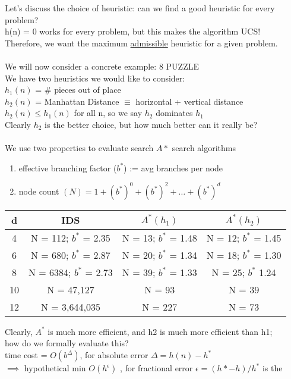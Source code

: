\documentclass[../../lecture_notes.tex]{subfiles}
\begin{document}
\noindent Let’s discuss the choice of heuristic: can we find a good heuristic for every problem?\\
	\indent h(n) = 0 works for every problem, but this makes the algorithm UCS!\\
Therefore, we want the maximum \underline{admissible} heuristic for a given problem.\\
\\
We will now consider a concrete example: 8 PUZZLE\\
We have two heuristics we would like to consider:\\
\indent $h_1(n)$ = \# pieces out of place \\
\indent $h_2(n)$ = Manhattan Distance $\equiv$ horizontal + vertical distance \\
$h_2(n) \leq h_1(n)$ for all n, so we say $h_2$ dominates $h_1$\\
Clearly $h_2$ is the better choice, but how much better can it really be?\\
\\
We use two properties to evaluate search $A*$ search algorithms
\begin{enumerate} [itemsep=0mm]
	\item effective branching factor ($b^*$) := avg branches per node
	\item node count $(N) = 1 + (b^*)^0 + (b^*)^2 + … + (b^*)^d$
\end{enumerate} \medskip

\begin{tabular} { c | c c c }
d & IDS & $A^*(h_1)$  & $A^*(h_2)$\\
\hline
4  & N = 112; $b^*$ = 2.35  & N = 13; $b^*$ = 1.48 & N = 12; $b^*$ = 1.45\\
6 & N = 680; $b^*$ = 2.87 & N = 20; $b^*$ = 1.34 & N = 18; $b^*$ = 1.30\\
8 & N = 6384; $b^*$ = 2.73 & N = 39; $b^*$ = 1.33 & N = 25; $b^*$ 1.24\\
10 & N = 47,127 & N = 93 & N = 39\\
12 & N = 3,644,035 & N = 227 & N = 73 
\end{tabular} \medskip

\noindent Clearly, $A^*$ is much more efficient, and h2 is much more efficient than h1;\\
\indent how do we formally evaluate this?\\
\indent \indent time cost = $O(b^\Delta)$, for absolute error $\Delta = h(n) - h^*$\\
\indent \indent $\implies$ hypothetical min $O(h^\epsilon)$ , for fractional error $\epsilon = (h* - h) / h^*$ is the
\end{document}
